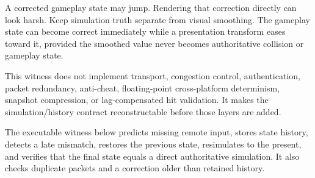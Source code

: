 A corrected gameplay state may jump. Rendering that correction directly can look harsh. Keep simulation truth separate from visual smoothing. The gameplay state can become correct immediately while a presentation transform eases toward it, provided the smoothed value never becomes authoritative collision or gameplay state.

This witness does not implement transport, congestion control, authentication, packet redundancy, anti-cheat, floating-point cross-platform determinism, snapshot compression, or lag-compensated hit validation. It makes the simulation/history contract reconstructable before those layers are added.

The executable witness below predicts missing remote input, stores state history, detects a late mismatch, restores the previous state, resimulates to the present, and verifies that the final state equals a direct authoritative simulation. It also checks duplicate packets and a correction older than retained history.

